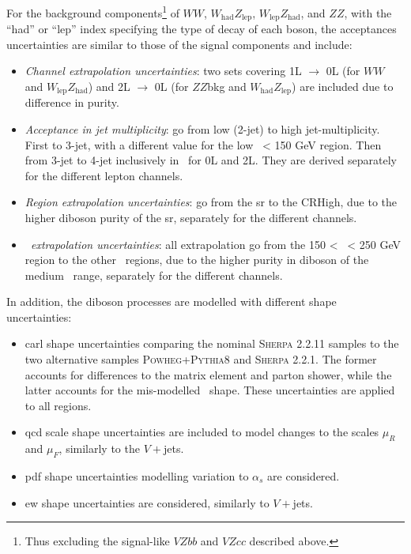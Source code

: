 For the background components\footnote{Thus excluding the signal-like $VZbb$ and $VZcc$ described above.} of $WW$, $W_{\text{had}}Z_{\text{lep}}$, $W_{\text{lep}}Z_{\text{had}}$, and $ZZ$, with the ``had'' or ``lep'' index specifying the type of decay of each boson, the acceptances uncertainties are similar to those of the signal components and include:
\begin{itemize}[leftmargin=*]
    \item \textit{Channel extrapolation uncertainties}: two sets covering 1L $\rightarrow$ 0L (for $WW$ and $W_{\text{lep}}Z_{\text{had}}$) and 2L $\rightarrow$ 0L (for $ZZ$bkg and $W_{\text{had}}Z_{\text{lep}}$) are included due to difference in purity.
    \item \textit{Acceptance in jet multiplicity}: go from low (2-jet) to high jet-multiplicity. First to 3-jet, with a different value for the low \ptv\ < 150 GeV region. Then from 3-jet to 4-jet inclusively in \ptv\ for 0L and 2L. They are derived separately for the different lepton channels. %
    \item \textit{Region extrapolation uncertainties}: go from the \gls{sr} to the CRHigh, due to the higher diboson purity of the \gls{sr}, separately for the different channels.
    \item \textit{\ptv\ extrapolation uncertainties}: all extrapolation go from the 150 < \ptv\ < 250 GeV region to the other \ptv\ regions, due to the higher purity in diboson of the medium \ptv\ range, separately for the different channels.
\end{itemize}

In addition, the diboson processes are modelled with different shape uncertainties:
\begin{itemize}
    \item \gls{carl} shape uncertainties comparing the nominal \textsc{Sherpa} 2.2.11 samples to the two alternative samples \textsc{Powheg}+\textsc{Pythia}8 and \textsc{Sherpa} 2.2.1. The former accounts for differences to the matrix element and parton shower, while the latter accounts for the mis-modelled \ptv\ shape. These uncertainties are applied to all regions.
    \item \gls{qcd} scale shape uncertainties are included to model changes to the scales $\mu_R$ and $\mu_F$, similarly to the $V+$jets.
    \item \gls{pdf} shape uncertainties modelling variation to $\alpha_s$ are considered.
    \item \gls{ew} shape uncertainties are considered, similarly to $V+$jets.
\end{itemize}

